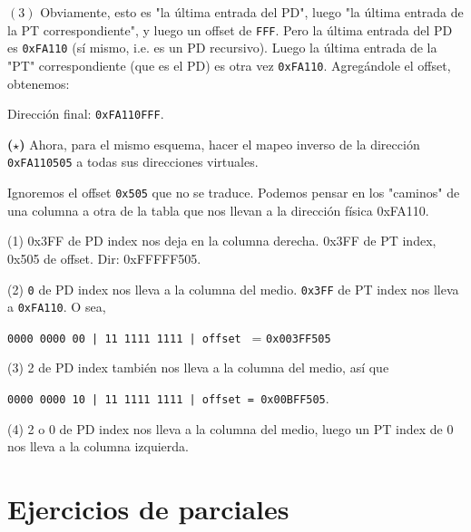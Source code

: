 \documentclass[12pt]{article}
\theoremstyle{definition}
\begin{document}
$(3)$ Obviamente, esto es "la última entrada del PD", luego "la última entrada
de la PT correspondiente", y luego un offset de \texttt{FFF}. Pero la última
entrada del PD es \texttt{0xFA110} (sí mismo, i.e. es un PD recursivo). Luego la
última entrada de la "PT" correspondiente (que es el PD) es otra vez
\texttt{0xFA110}. Agregándole el offset, obtenemos:

Dirección final: \texttt{0xFA110FFF}.

\begin{shaded}
    \textbf{($\star$)} Ahora, para el mismo esquema, hacer el mapeo inverso de
    la dirección \texttt{0xFA110505} a todas sus direcciones virtuales.
\end{shaded}

Ignoremos el offset \texttt{0x505} que no se  traduce. Podemos pensar en los
"caminos" de una columna a otra de la tabla que nos llevan a la dirección física
0xFA110. 

(1) 0x3FF de PD index nos deja en la columna derecha. 0x3FF de PT index, 0x505 de offset. Dir: 0xFFFFF505.

(2) \texttt{0} de PD index nos lleva a la columna del medio. \texttt{0x3FF}
de PT index nos lleva a \texttt{0xFA110}. O sea, 

\texttt{0000 0000 00 | 11 1111 1111 | offset   } = \texttt{0x003FF505}

(3) 2 de PD index también nos lleva a la columna del medio, así que 

\texttt{0000 0000 10 | 11 1111 1111 | offset = 0x00BFF505}.

(4) 2 o 0 de PD index nos lleva a la columna del medio, luego un PT index de 0
nos lleva a la columna izquierda.

\pagebreak 

\section{Ejercicios de parciales}
\end{document}

